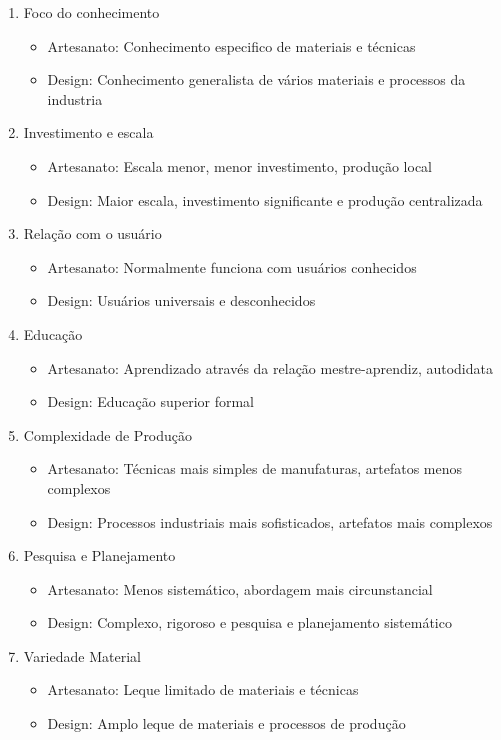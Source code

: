 \documentclass{article}
\begin{document}
\begin{enumerate}
    \item Foco do conhecimento
    \begin{itemize}
        \item Artesanato: Conhecimento especifico de materiais e técnicas
        \item Design: Conhecimento generalista de vários materiais e processos da industria
    \end{itemize}
    \item Investimento e escala
    \begin{itemize}
        \item Artesanato: Escala menor, menor investimento, produção local
        \item Design: Maior escala, investimento significante e produção centralizada
    \end{itemize}
    \item Relação com o usuário
    \begin{itemize}
        \item Artesanato: Normalmente funciona com usuários conhecidos
        \item Design: Usuários universais e desconhecidos
    \end{itemize}
    \item Educação
    \begin{itemize}
        \item Artesanato: Aprendizado através da relação mestre-aprendiz, autodidata
        \item Design: Educação superior formal
    \end{itemize}
    \item Complexidade de Produção
    \begin{itemize}
        \item Artesanato: Técnicas mais simples de manufaturas, artefatos menos complexos
        \item Design: Processos industriais mais sofisticados, artefatos mais complexos
    \end{itemize}
    \item Pesquisa e Planejamento
    \begin{itemize}
        \item Artesanato: Menos sistemático, abordagem mais circunstancial
        \item Design: Complexo, rigoroso e pesquisa e planejamento sistemático
    \end{itemize}
    \item Variedade Material
    \begin{itemize}
        \item Artesanato: Leque limitado de materiais e técnicas
        \item Design: Amplo leque de materiais e processos de produção
    \end{itemize}
\end{enumerate}
\newpage
\end{document}
